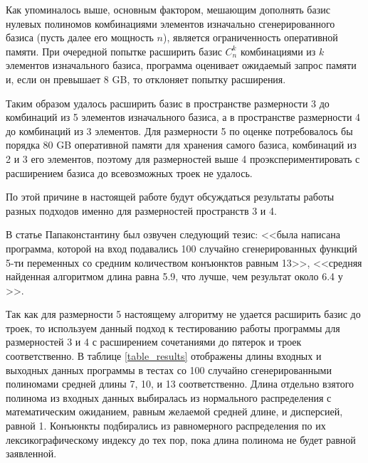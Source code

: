 \documentclass[a4paper,12pt,titlepage]{article}
\begin{document}
Как упоминалось выше, основным фактором, мешающим дополнять базис нулевых полиномов комбинациями элементов изначально сгенерированного базиса (пусть далее его мощность $ n $), является ограниченность оперативной памяти. При очередной попытке расширить базис $ C_n^k $ комбинациями из $ k $ элементов изначального базиса, программа оценивает ожидаемый запрос памяти и, если он превышает 8 GB, то отклоняет попытку расширения.

Таким образом удалось расширить базис в пространстве размерности 3 до комбинаций из 5 элементов изначального базиса, а в пространстве размерности 4 до комбинаций из 3 элементов. Для размерности 5 по оценке потребовалось бы порядка 80 GB оперативной памяти для хранения самого базиса, комбинаций из 2 и 3 его элементов, поэтому для размерностей выше 4 проэкспериментировать с расширением базиса до всевозможных троек не удалось.

По этой причине в настоящей работе будут обсуждаться результаты работы разных подходов именно для размерностей пространств 3 и 4.

В статье Папаконстантину \cite{513100} был озвучен следующий тезис: <<была написана программа, которой на вход подавались 100 случайно сгенерированных функций 5-ти переменных со средним количеством конъюнктов равным 13>>, <<средняя найденная алгоритмом длина равна 5.9, что лучше, чем результат около 6.4 у \cite{beat1, beat2}>>.

Так как для размерности 5 настоящему алгоритму не удается расширить базис до троек, то используем данный подход к тестированию работы программы для размерностей 3 и 4 с расширением сочетаниями до пятерок и троек соответственно. В таблице \ref{table_results} отображены длины входных и выходных данных программы в тестах со 100 случайно сгенерированными полиномами средней длины 7, 10, и 13 соответственно. Длина отдельно взятого полинома из входных данных выбиралась из нормального распределения с математическим ожиданием, равным желаемой средней длине, и дисперсией, равной 1. Конъюнкты подбирались из равномерного распределения по их лексикографическому индексу до тех пор, пока длина полинома не будет равной заявленной.
\end{document}
